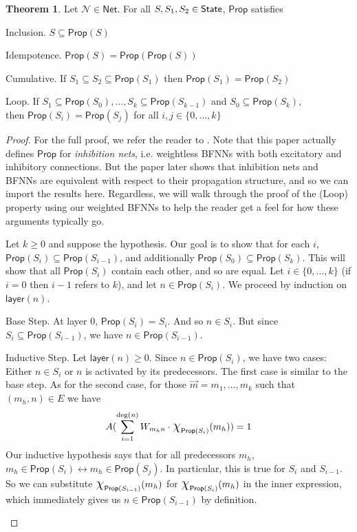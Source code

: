 \documentclass[letterpaper]{article}
\theoremstyle{definition}
\newtheorem{theorem}{Theorem}
\newcommand{\State}{\mbox{\sf State}}
\newcommand{\set}[1]{\{ #1 \}}
\newcommand*{\bigchi}{\mbox{\Large$\chi$}}%
\newcommand{\degree}[1]{\mathrm{deg}(#1)}
\newcommand{\layer}[1]{\mathsf{layer}(#1)}
\newcommand{\Prop}{\textsf{Prop}}
\newcommand{\AllNets}{\mathsf{Net}}
\newcommand{\Net}{\mathcal{N}}
\begin{document}
\begin{theorem}
\label{thm:prop-props}
Let $\Net \in \AllNets$.  For all $S, S_1, S_2 \in \State$, $\Prop$ satisfies
\begin{compactdesc}
    \item[Inclusion.] $S \subseteq \Prop(S)$
    
    \item[Idempotence.] $\Prop(S) = \Prop(\Prop(S))$
    
    \item[Cumulative.] If ${S_1 \subseteq S_2 \subseteq \Prop(S_1)}$ then ${\Prop(S_1) = \Prop(S_2)}$
    
    \item[Loop.] If ${S_1 \subseteq \Prop(S_0)}, \ldots, {S_k \subseteq \Prop(S_{k-1})}$ and ${S_0 \subseteq \Prop(S_k)}$,\\ then ${\Prop(S_i) = \Prop(S_j)}$
    for all $i, j \in \set{0, \ldots, k}$
\end{compactdesc}
\end{theorem}
\begin{proof} For the full proof, we refer the reader to \cite{leitgeb2001nonmonotonic}.  Note that this paper actually defines $\Prop$ for \emph{inhibition nets}, i.e. weightless BFNNs with both excitatory and inhibitory connections.  But the paper later shows that inhibition nets and BFNNs are equivalent with respect to their propagation structure, and so we can import the results here.  Regardless, we will walk through the proof of the (Loop) property using our weighted BFNNs to help the reader get a feel for how these arguments typically go.

Let $k \geq 0$ and suppose the hypothesis.  Our goal is to show that for each $i$, $\Prop(S_i) \subseteq \Prop(S_{i-1})$, and additionally $\Prop(S_0) \subseteq \Prop(S_k)$.  This will show that all $\Prop(S_i)$ contain each other, and so are equal.  Let $i \in \set{0, \ldots, k}$ (if $i = 0$ then $i-1$ refers to $k$), and let $n \in \Prop(S_i)$.  We proceed by induction on $\layer{n}$.

\begin{compactdesc}
\item[Base Step.] At layer $0$, $\Prop(S_i) = S_i$. And so $n \in S_i$. But since $S_i \subseteq \Prop(S_{i-1})$, we have $n \in \Prop(S_{i-1})$.

\item[Inductive Step.] Let $\layer{n} \geq 0$. Since $n \in \Prop(S_i)$, we have two cases: Either $n \in S_i$ or $n$ is activated by its predecessors.  The first case is similar to the base step.  As for the second case, for those $\vec{m} = m_1, \ldots, m_k$ such that $(m_h, n) \in E$ we have
\[
    A(\sum_{i=1}^{\degree{n}} W_{m_h n} \cdot \bigchi_{\Prop(S_i)}(m_h)) = 1
\]
Our inductive hypothesis says that for all predecessors $m_h$, $m_h \in \Prop(S_i) \leftrightarrow m_h \in \Prop(S_j)$.  In particular, this is true for $S_i$ and $S_{i-1}$.  So we can substitute $\bigchi_{\Prop(S_{i-1})}(m_h)$ for $\bigchi_{\Prop(S_i)}(m_h)$ in the inner expression, which immediately gives us $n \in \Prop(S_{i-1})$ by definition.\qedhere
\end{compactdesc}
\end{proof}
\end{document}
